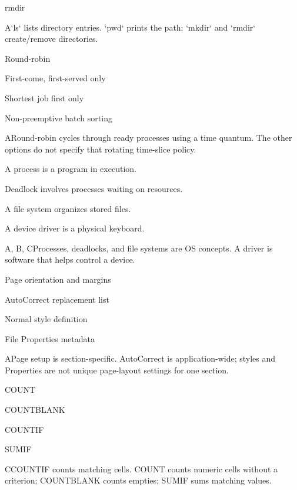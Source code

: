 \begin{enumerate}[label=\textbf{Q\arabic*.}, leftmargin=*]
{   \item rmdir}
  {A}{`ls` lists directory entries. `pwd` prints the path; `mkdir` and `rmdir` create/remove directories.}
  {\item Round-robin
   \item First-come, first-served only
   \item Shortest job first only
   \item Non-preemptive batch sorting}
  {A}{Round-robin cycles through ready processes using a time quantum. The other options do not specify that rotating time-slice policy.}
  {\item A process is a program in execution.
   \item Deadlock involves processes waiting on resources.
   \item A file system organizes stored files.
   \item A device driver is a physical keyboard.}
  {A, B, C}{Processes, deadlocks, and file systems are OS concepts. A driver is software that helps control a device.}
\fi
\ifnum{}
  {\item Page orientation and margins
   \item AutoCorrect replacement list
   \item Normal style definition
   \item File Properties metadata}
  {A}{Page setup is section-specific. AutoCorrect is application-wide; styles and Properties are not unique page-layout settings for one section.}
  {\item COUNT
   \item COUNTBLANK
   \item COUNTIF
   \item SUMIF}
  {C}{COUNTIF counts matching cells. COUNT counts numeric cells without a criterion; COUNTBLANK counts empties; SUMIF sums matching values.}

\end{enumerate}
